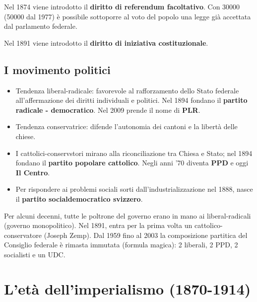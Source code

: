 \documentclass[a4paper]{article}
\begin{document}
Nel 1874 viene introdotto il \textbf{diritto di referendum facoltativo}.
Con 30000 (50000 dal 1977) è possibile sottoporre al voto del popolo una legge già accettata dal parlamento federale.

Nel 1891 viene introdotto il \textbf{diritto di iniziativa costituzionale}.

\subsection{I movimento politici}

\begin{itemize}
    \item Tendenza liberal-radicale: favorevole al rafforzamento dello Stato federale all'affermazione dei diritti individuali e politici.
    Nel 1894 fondano il \textbf{partito radicale - democratico}.
    Nel 2009 prende il nome di \textbf{PLR}.
    \item Tendenza conservatrice: difende l'autonomia dei cantoni e la libertà delle chiese.
    \item I cattolici-conservstori mirano alla riconciliazione tra Chiesa e Stato; nel 1894 fondano il \textbf{partito popolare cattolico}.
    Negli anni '70 diventa \textbf{PPD} e oggi \textbf{Il Centro}.
    \item Per rispondere ai problemi sociali sorti dall'industrializzazione nel 1888, nasce il \textbf{partito socialdemocratico svizzero}.
\end{itemize}

Per alcuni decenni, tutte le poltrone del governo erano in mano ai liberal-radicali (governo monopolitico).
Nel 1891, entra per la prima volta un cattolico-conservatore (Joseph Zemp).
Dal 1959 fino al 2003 la composizione partitica del Consiglio federale è rimasta immutata (formula magica):
2 liberali, 2 PPD, 2 socialisti e un UDC.

\pagebreak

\section{L'età dell'imperialismo (1870-1914)} %


    
\end{document}
